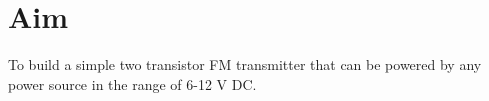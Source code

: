 \chapter{Aim}
To build a simple two transistor FM transmitter that can be powered by any power source in the range of 6-12 V DC.

